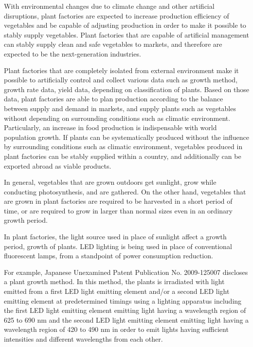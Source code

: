 \documentclass[11pt,a4paper]{article}
\begin{document}
With environmental changes due to climate change and other artificial disruptions, plant factories are expected to increase production efficiency of vegetables and be capable of adjusting production in order to make it possible to stably supply vegetables. Plant factories that are capable of artificial management can stably supply clean and safe vegetables to markets, and therefore are expected to be the next-generation industries.

Plant factories that are completely isolated from external environment make it possible to artificially control and collect various data such as growth method, growth rate data, yield data, depending on classification of plants. Based on those data, plant factories are able to plan production according to the balance between supply and demand in markets, and supply plants such as vegetables without depending on surrounding conditions such as climatic environment. Particularly, an increase in food production is indispensable with world population growth. If plants can be systematically produced without the influence by surrounding conditions such as climatic environment, vegetables produced in plant factories can be stably supplied within a country, and additionally can be exported abroad as viable products.

In general, vegetables that are grown outdoors get sunlight, grow while conducting photosynthesis, and are gathered. On the other hand, vegetables that are grown in plant factories are required to be harvested in a short period of time, or are required to grow in larger than normal sizes even in an ordinary growth period.

In plant factories, the light source used in place of sunlight affect a growth period, growth of plants. LED lighting is being used in place of conventional fluorescent lamps, from a standpoint of power consumption reduction.

For example, Japanese Unexamined Patent Publication No. 2009-125007 discloses a plant growth method. In this method, the plants is irradiated with light emitted from a first LED light emitting element and/or a second LED light emitting element at predetermined timings using a lighting apparatus including the first LED light emitting element emitting light having a wavelength region of 625 to 690 nm and the second LED light emitting element emitting light having a wavelength region of 420 to 490 nm in order to emit lights having sufficient intensities and different wavelengths from each other.
\end{document}
